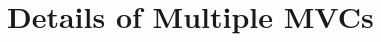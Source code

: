\documentclass{article}[11pt]
\newcommand{\Rfunction}[1]{{\textsf{#1}}}
\newcommand{\Rclass}[1]{\texttt{#1}}
\begin{document}




\section{Details of Multiple MVCs}
\label{Sec:MultMVC}
\end{document}
